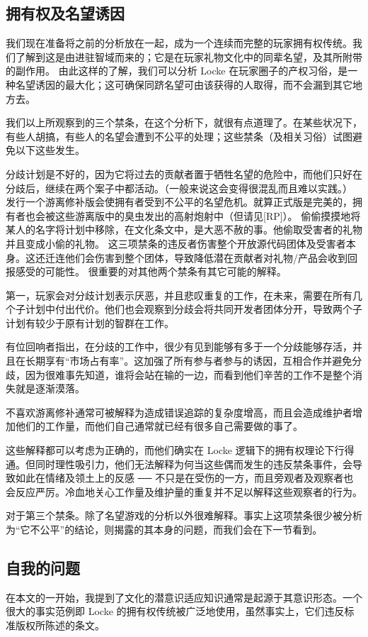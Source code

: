 \subsection{拥有权及名望诱因}
我们现在准备将之前的分析放在一起，成为一个连续而完整的玩家拥有权传统。我们了解到这是由进驻智域而来的；它是在玩家礼物文化中的同辈名望，及其所附带的副作用。
由此这样的了解，我们可以分析 Locke 在玩家圈子的产权习俗，是一种名望诱因的最大化；这可确保同跻名望可由该获得的人取得，而不会漏到其它地方去。

我们以上所观察到的三个禁条，在这个分析下，就很有点道理了。在某些状况下，有些人胡搞，有些人的名望会遭到不公平的处理；这些禁条（及相关习俗）试图避免以下这些发生。

分歧计划是不好的，因为它将过去的贡献者置于牺牲名望的危险中，而他们只好在分歧后，继续在两个案子中都活动。（一般来说这会变得很混乱而且难以实践。）
发行一个游离修补版会使拥有者受到不公平的名望危机。就算正式版是完美的，拥有者也会被这些游离版中的臭虫发出的高射炮射中（但请见[RP]）。
偷偷摸摸地将某人的名字将计划中移除，在文化条文中，是大恶不赦的事。他偷取受害者的礼物并且变成小偷的礼物。
这三项禁条的违反者伤害整个开放源代码团体及受害者本身。这还迁连他们会伤害到整个团体，导致降低潜在贡献者对礼物/产品会收到回报感受的可能性。
很重要的对其他两个禁条有其它可能的解释。

第一，玩家会对分歧计划表示厌恶，并且悲叹重复的工作，在未来，需要在所有几个子计划中付出代价。他们也会观察到分歧会将共同开发者团体分开，导致两个子计划有较少于原有计划的智群在工作。

有位回响者指出，在分歧的工作中，很少有见到能够有多于一个分歧能够存活，并且在长期享有“市场占有率”。这加强了所有参与者参与的诱因，互相合作并避免分歧，因为很难事先知道，谁将会站在输的一边，而看到他们辛苦的工作不是整个消失就是逐渐漠落。

不喜欢游离修补通常可被解释为造成错误追踪的复杂度增高，而且会造成维护者增加他们的工作量，而他们自己通常就已经有很多自己需要做的事了。

这些解释都可以考虑为正确的，而他们确实在 Locke 逻辑下的拥有权理论下行得通。但同时理性吸引力，他们无法解释为何当这些偶而发生的违反禁条事件，会导致如此在情绪及领土上的反感  ──  不只是在受伤的一方，而且旁观者及观察者也会反应严厉。冷血地关心工作量及维护量的重复并不足以解释这些观察者的行为。

对于第三个禁条。除了名望游戏的分析以外很难解释。事实上这项禁条很少被分析为“它不公平”的结论，则揭露的其本身的问题，而我们会在下一节看到。


\subsection{自我的问题}
在本文的一开始，我提到了文化的潜意识适应知识通常是起源于其意识形态。一个很大的事实范例即 Locke 的拥有权传统被广泛地使用，虽然事实上，它们违反标准版权所陈述的条文。

